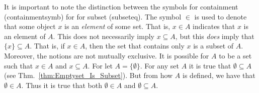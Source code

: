         It is important to note the distinction between the symbols for
        containment (\gls{containmentsymb}) for for subset
        (\gls{subseteq}). The symbol $\in$ is used to denote that some object
        $x$ is an \textit{element} of some set. That is,
        $x\in{A}$ indicates that $x$ is an element of $A$. This does not
        necessarily imply $x\subseteq{A}$, but this \textit{does} imply that
        $\{x\}\subseteq{A}$. That is, if $x\in{A}$, then the set that contains
        only $x$ is a subset of $A$. Moreover, the notions are not mutually
        exclusive. It is possible for $A$ to be a set such that $x\in{A}$ and
        $x\subseteq{A}$. For let $A=\{\emptyset\}$. For any set $A$ it is true
        that $\emptyset\subseteq{A}$ (see Thm.~\ref{thm:Emptyset_Is_Subset}).
        But from how $A$ is defined, we have that $\emptyset\in{A}$. Thus it is
        true that both $\emptyset\in{A}$ and $\emptyset\subseteq{A}$.
